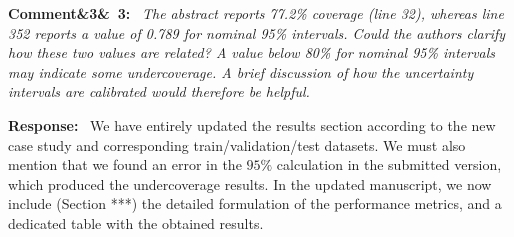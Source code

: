 \documentclass[11pt]{article}
\newenvironment{rcomment}[1]{\par\bigskip\noindent\textbf{Comment\ifx&#1&\else\ #1\fi:}\ \itshape}{\par}
\newenvironment{response}{\par\smallskip\noindent\color{resp}\textbf{Response:}\ }{\par}
\begin{document}
\begin{rcomment}{3}
The abstract reports 77.2\% coverage (line 32), whereas line 352 reports a value of 0.789 for nominal 95\% intervals.
Could the authors clarify how these two values are related? A value below 80\% for nominal 95\% intervals may indicate
some undercoverage. A brief discussion of how the uncertainty intervals are calibrated would therefore be helpful.
\end{rcomment}
\begin{response}
We have entirely updated the results section according to the new case study and corresponding train/validation/test datasets. 
We must also mention that we found an error in the $95\%$ calculation in the submitted version, which produced the undercoverage results. 
In the updated manuscript, we now include (Section ***) the detailed formulation of the performance metrics, and a dedicated table with the obtained results. 
	

\end{response}
\end{document}
